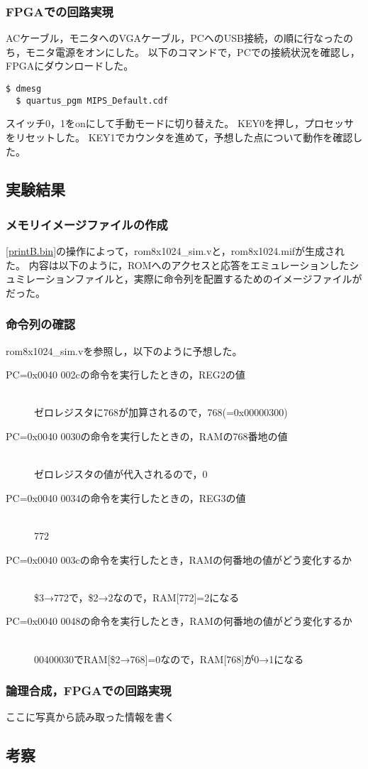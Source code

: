 \subsubsection{FPGAでの回路実現}
ACケーブル，モニタへのVGAケーブル，PCへのUSB接続，の順に行なったのち，モニタ電源をオンにした。
以下のコマンドで，PCでの接続状況を確認し，FPGAにダウンロードした。
\begin{lstlisting}[caption={FPGAでの回路実現},label={FPGAでの回路実現1-1}]
  $ dmesg
  $ quartus_pgm MIPS_Default.cdf
\end{lstlisting}

スイッチ0，1をonにして手動モードに切り替えた。
KEY0を押し，プロセッサをリセットした。
KEY1でカウンタを進めて，予想した点について動作を確認した。

\subsection{実験結果}
\subsubsection{メモリイメージファイルの作成}
\ref{printB.bin}の操作によって，rom8x1024\_sim.vと，rom8x1024.mifが生成された。
内容は以下のように，ROMへのアクセスと応答をエミュレーションしたシュミレーションファイルと，実際に命令列を配置するためのイメージファイルがだった。

\subsubsection{命令列の確認}
rom8x1024\_sim.vを参照し，以下のように予想した。

\begin{description}
  \item [PC=0x0040 002cの命令を実行したときの，REG2の値]\mbox{}\\
    ゼロレジスタに768が加算されるので，768(=0x00000300)
  \item [PC=0x0040 0030の命令を実行したときの，RAMの768番地の値]\mbox{}\\
  ゼロレジスタの値が代入されるので，0
  \item [PC=0x0040 0034の命令を実行したときの，REG3の値]\mbox{}\\
    772
  \item [PC=0x0040 003cの命令を実行したとき，RAMの何番地の値がどう変化するか]\mbox{}\\
    \$3→772で，\$2→2なので，RAM[772]=2になる
  \item [PC=0x0040 0048の命令を実行したとき，RAMの何番地の値がどう変化するか]\mbox{}\\
    00400030でRAM[\$2→768]=0なので，RAM[768]が0→1になる
\end{description}

\subsubsection{論理合成，FPGAでの回路実現}
ここに写真から読み取った情報を書く

\subsection{考察}
